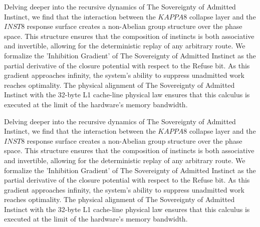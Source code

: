 \documentclass[12pt,a4paper,oneside]{book}
\begin{document}
Delving deeper into the recursive dynamics of The Sovereignty of Admitted Instinct, we find that the interaction between the $KAPPA8$ collapse layer and the $INST8$ response surface creates a non-Abelian group structure over the phase space. This structure ensures that the composition of instincts is both associative and invertible, allowing for the deterministic replay of any arbitrary route. We formalize the 'Inhibition Gradient' of The Sovereignty of Admitted Instinct as the partial derivative of the closure potential with respect to the Refuse bit. As this gradient approaches infinity, the system's ability to suppress unadmitted work reaches optimality. The physical alignment of The Sovereignty of Admitted Instinct with the 32-byte L1 cache-line physical law ensures that this calculus is executed at the limit of the hardware's memory bandwidth. 

Delving deeper into the recursive dynamics of The Sovereignty of Admitted Instinct, we find that the interaction between the $KAPPA8$ collapse layer and the $INST8$ response surface creates a non-Abelian group structure over the phase space. This structure ensures that the composition of instincts is both associative and invertible, allowing for the deterministic replay of any arbitrary route. We formalize the 'Inhibition Gradient' of The Sovereignty of Admitted Instinct as the partial derivative of the closure potential with respect to the Refuse bit. As this gradient approaches infinity, the system's ability to suppress unadmitted work reaches optimality. The physical alignment of The Sovereignty of Admitted Instinct with the 32-byte L1 cache-line physical law ensures that this calculus is executed at the limit of the hardware's memory bandwidth. 
\end{document}
